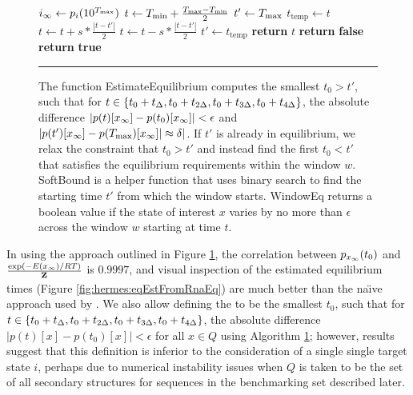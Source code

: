 \begin{figure}[!ht]
\begin{algorithmic}[1]
\State $i_{\infty} \gets p_i(10^{T_{\max}})$
\State $t \gets T_{\min} + \frac{T_{\max} - T_{\min}}{2}$
\State $t' \gets T_{\max}$
\State $t_{\text{temp}} \gets t$
\State $t \gets t + s * \frac{|t - t'|}{2}$
\Else
\State $t \gets t - s * \frac{|t - t'|}{2}$
\EndIf
\State $t' \gets t_{\text{temp}}$
\EndWhile
\State \textbf{return} $t$
\EndFunction
{}
\State \textbf{return} \textbf{false}
\EndIf
\EndFor
\State \textbf{return} \textbf{true}
\EndFunction
\rule[-0.35ex]{0pt}{0pt}
\end{algorithmic}
\caption{The function {\sc EstimateEquilibrium} computes the smallest $t_0 > t'$,
such that for $t \in \{t_0+t_{\Delta},t_0+t_{2\Delta},t_0+t_{3\Delta},t_0+t_{4\Delta}\}$,
the absolute difference $|p(t)[x_\infty] - p(t_0)[x_\infty]| < \epsilon$ and
$|p(t')[x_\infty] - p(T_{\max})[x_\infty]| \approx \delta|$. If $t'$ is already in
equilibrium, we relax the constraint that $t_0 > t'$ and instead find the
first $t_0 < t'$ that satisfies the equilibrium requirements within the window
$w$. {\sc SoftBound} is a helper function that uses binary search to find the
starting time $t'$ from which the window starts. {\sc WindowEq} returns a
boolean value if the state of interest $x$ varies by no more than $\epsilon$
across the window $w$ starting at time $t$.}
\label{fig:hermes:eqEst}
\rule[0ex]{0pt}{1.5em} \hrule
\end{figure}

In using the approach outlined in Figure \ref{fig:hermes:eqEst}, the correlation
between $p_{x_\infty}(t_0)$ and $\frac{\exp(-E(x_\infty)/RT)}{{\bf Z}^{}_{}}$ is $0.9997$, and
visual inspection of the estimated equilibrium times
(Figure \ref{fig:hermes:eqEstFromRnaEq}) are much better than the
na\"{\i}ve approach used by \treekin. We also allow defining the \eqt to be the
smallest $t_0$, such that for
$t \in \{t_0+t_{\Delta},t_0+t_{2\Delta},t_0+t_{3\Delta},t_0+t_{4\Delta}\}$, the
absolute difference $|p(t)[x] - p(t_0)[x]| < \epsilon$ for all $x \in
Q$ using Algorithm \ref{fig:hermes:eqEst};
however, results suggest that this definition is inferior
to the consideration of a single single target state $i$,
perhaps due to numerical instability issues when
$Q$ is taken to be the set of all secondary structures for sequences in
the benchmarking set described later.

